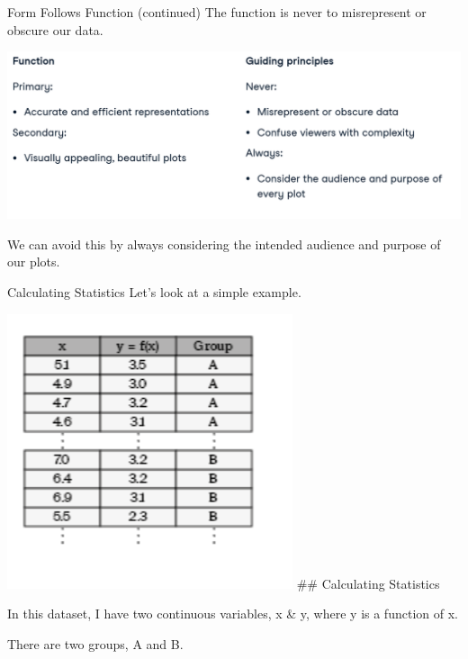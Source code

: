 \documentclass[
  ignorenonframetext,
]{beamer}
\begin{document}
\begin{frame}{Form Follows Function (continued)}
\label{form-follows-function-continued-2}
The function is never to misrepresent or obscure our data.

\includegraphics{../images/im167.png}

We can avoid this by always considering the intended audience and
purpose of our plots.
\end{frame}

\begin{frame}{Calculating Statistics}
\label{calculating-statistics}
Let's look at a simple example.

\includegraphics{../images/im168.png} \#\# Calculating Statistics

In this dataset, I have two continuous variables, x \& y, where y is a
function of x.

There are two groups, A and B.
\end{frame}
\end{document}
